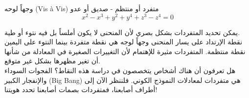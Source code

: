 \begin{surferPage}{وجهاً لوحه (Vis à Vis)}
متفرد أو منتظم - صديق أو عدو\\
\smallskip
\[x^2	- x^3+ y^2+ y^4+ z^3- z^4	=  0\]

\vspace{0.3cm}
يمكن تحديد المتفردات بشكل بصري لأن المنحنى لا يكون أملساً بل فيه نتوء أو طية.\\
\vspace{0.3cm}
نقطة الإرتداد على يسار المنحنى وجهاً لوجه هي نقطة متفردة بينما النتوء على اليمين نقطة منتظمة. المتفردات مثيرة للإهتمام لأن التغييرات الصغيرة في المعادلة من شأنها أن تغير مظهرها بشكل غير متوقع. \\ 

\vspace{0.3cm}
هل تعرفون أن هناك أشخاص يتخصصون في دراسة هذه النقاط؟ الفجوات السوداء والإنفجار الكبير (Big Bang) هي متفردات لمعادلات النموذج الكوني. فلننظر الآن إلى أطراف أصابعنا، فمتفردات بصمات أصابعنا تحدد هويتنا!
\end{surferPage}
